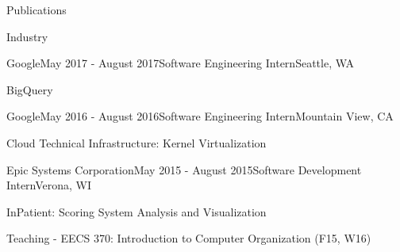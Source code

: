 \documentclass{resume} %
\begin{document}
\begin{rSection}{Publications}


\end{rSection}


\begin{rSection}{Industry}

\begin{rSubsection}{Google}{May 2017 - August 2017}{Software Engineering
Intern}{Seattle, WA}
\item BigQuery
\end{rSubsection}

\begin{rSubsection}{Google}{May 2016 - August 2016}{Software Engineering
Intern}{Mountain View, CA}
\item Cloud Technical Infrastructure: Kernel Virtualization
\end{rSubsection}

\begin{rSubsection}{Epic Systems Corporation}{May 2015 - August 2015}{Software
Development Intern}{Verona, WI}
\item InPatient: Scoring System Analysis and Visualization
\end{rSubsection}
\end{rSection}

\begin{rSection}{Teaching}
- EECS 370: Introduction to Computer Organization (F15, W16)
\end{rSection}
\end{document}
